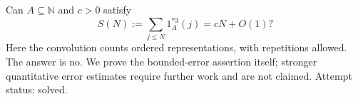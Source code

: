 Can \(A\subseteq\mathbb N\) and \(c>0\) satisfy
\[
S(N):=\sum_{j\leq N}1_A^{*3}(j)=cN+O(1)?
\]
Here the convolution counts ordered representations, with repetitions allowed. The answer is no. We prove the bounded-error assertion itself; stronger quantitative error estimates require further work and are not claimed. Attempt status: solved.
